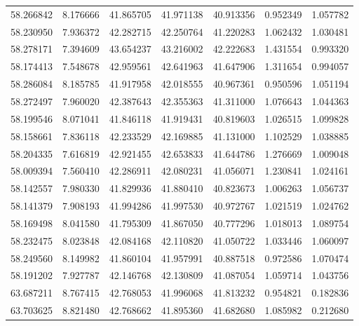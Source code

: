 \begin{tabular}{rrrrrrr}
 58.266842 &   8.176666 &         41.865705 &         41.971138 &         40.913356 &  0.952349 &  1.057782 \\
 58.230950 &   7.936372 &         42.282715 &         42.250764 &         41.220283 &  1.062432 &  1.030481 \\
 58.278171 &   7.394609 &         43.654237 &         43.216002 &         42.222683 &  1.431554 &  0.993320 \\
 58.174413 &   7.548678 &         42.959561 &         42.641963 &         41.647906 &  1.311654 &  0.994057 \\
 58.286084 &   8.185785 &         41.917958 &         42.018555 &         40.967361 &  0.950596 &  1.051194 \\
 58.272497 &   7.960020 &         42.387643 &         42.355363 &         41.311000 &  1.076643 &  1.044363 \\
 58.199546 &   8.071041 &         41.846118 &         41.919431 &         40.819603 &  1.026515 &  1.099828 \\
 58.158661 &   7.836118 &         42.233529 &         42.169885 &         41.131000 &  1.102529 &  1.038885 \\
 58.204335 &   7.616819 &         42.921455 &         42.653833 &         41.644786 &  1.276669 &  1.009048 \\
 58.009394 &   7.560410 &         42.286911 &         42.080231 &         41.056071 &  1.230841 &  1.024161 \\
 58.142557 &   7.980330 &         41.829936 &         41.880410 &         40.823673 &  1.006263 &  1.056737 \\
 58.141379 &   7.908193 &         41.994286 &         41.997530 &         40.972767 &  1.021519 &  1.024762 \\
 58.169498 &   8.041580 &         41.795309 &         41.867050 &         40.777296 &  1.018013 &  1.089754 \\
 58.232475 &   8.023848 &         42.084168 &         42.110820 &         41.050722 &  1.033446 &  1.060097 \\
 58.249560 &   8.149982 &         41.860104 &         41.957991 &         40.887518 &  0.972586 &  1.070474 \\
 58.191202 &   7.927787 &         42.146768 &         42.130809 &         41.087054 &  1.059714 &  1.043756 \\
 63.687211 &   8.767415 &         42.768053 &         41.996068 &         41.813232 &  0.954821 &  0.182836 \\
 63.703625 &   8.821480 &         42.768662 &         41.895360 &         41.682680 &  1.085982 &  0.212680 \\

\end{tabular}
